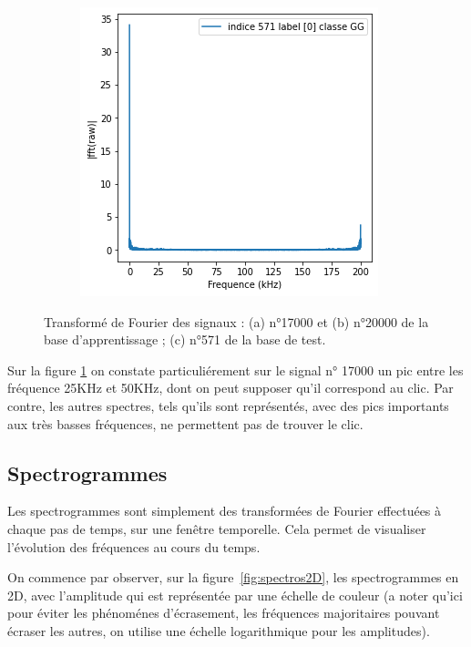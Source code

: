 \begin{figure}[!h]
\begin{subfigure}[b]{0.3\textwidth}
  \end{subfigure}
  \begin{subfigure}[b]{0.3\textwidth}
    \includegraphics[width=\textwidth]{./images/571fft.png}
  \end{subfigure}
  \caption{Transformé de Fourier des signaux : (a) n°17000 et (b) n°20000 de la base d'apprentissage ; (c) n°571 de la base de test.%
\label{fig:tf}}
\end{figure}

Sur la figure \ref{fig:tf} on constate particuliérement sur le signal n° 17000 un pic entre les fréquence 25KHz et 50KHz, dont on peut supposer qu'il correspond au clic.
Par contre, les autres spectres, tels qu'ils sont représentés, avec des pics importants aux très basses fréquences, ne permettent pas de trouver le clic.

\hypertarget{Spectrogrammes}{%
\subsection{Spectrogrammes}
\label{Spectrogrammes}}

Les spectrogrammes sont simplement des transformées de Fourier effectuées à chaque pas de temps, sur une fenêtre temporelle. Cela permet de visualiser l'évolution des fréquences au cours du temps.

On commence par observer, sur la figure~\ref{fig:spectros2D}, les spectrogrammes en 2D, avec l'amplitude qui est représentée par une échelle de couleur (a noter qu'ici pour éviter les phénoménes d'écrasement, les fréquences majoritaires pouvant écraser les autres, on utilise une échelle logarithmique pour les amplitudes).

